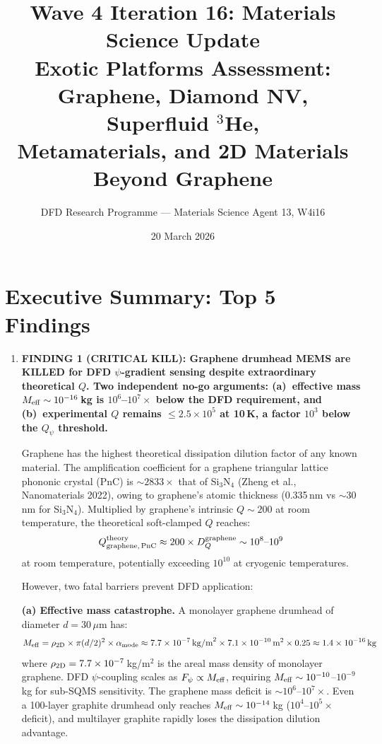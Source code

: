 \documentclass[11pt]{article}
\title{Wave 4 Iteration 16: Materials Science Update\\
\large Exotic Platforms Assessment:\\
Graphene, Diamond NV, Superfluid $^3$He,\\
Metamaterials, and 2D Materials Beyond Graphene}
\author{DFD Research Programme --- Materials Science Agent 13, W4i16}
\date{20 March 2026}
\theoremstyle{definition}
\theoremstyle{remark}
\newcommand{\ee}[1]{\times 10^{#1}}
\newcommand{\Meff}{M_{\rm eff}}
\newcommand{\Qpsi}{Q_\psi}
\begin{document}
\maketitle
\tableofcontents
\newpage

\section{Executive Summary: Top 5 Findings}
\label{sec:top5}

\begin{tcolorbox}[colback=blue!5!white, colframe=blue!50!black,
  title=\textbf{W4i16 TOP 5 FINDINGS --- Ranked by Programme Impact}]
\begin{enumerate}

\item \textbf{FINDING 1 (CRITICAL KILL): Graphene drumhead MEMS are
KILLED for DFD $\psi$-gradient sensing despite extraordinary
theoretical $Q$. Two independent no-go arguments: (a)~effective mass
$\Meff \sim 10^{-16}$\,kg is $10^{6}$--$10^{7}\times$ below the DFD
requirement, and (b)~experimental $Q$ remains $\leq 2.5\ee{5}$ at 10\,K,
a factor $10^{3}$ below the $\Qpsi$ threshold.}

Graphene has the highest theoretical dissipation dilution factor of any
known material. The amplification coefficient for a graphene triangular
lattice phononic crystal (PnC) is $\sim 2833\times$ that of Si$_3$N$_4$
(Zheng et al., Nanomaterials 2022), owing to graphene's
atomic thickness (0.335\,nm vs $\sim$30\,nm for Si$_3$N$_4$). Multiplied
by graphene's intrinsic $Q \sim 200$ at room temperature, the theoretical
soft-clamped $Q$ reaches:
\begin{equation}
Q_{\rm graphene,\,PnC}^{\rm theory} \approx 200 \times D_Q^{\rm graphene}
\sim 10^8\text{--}10^9
\label{eq:graphene_theory}
\end{equation}
at room temperature, potentially exceeding $10^{10}$ at cryogenic
temperatures.

However, two fatal barriers prevent DFD application:

\textbf{(a) Effective mass catastrophe.} A monolayer graphene drumhead
of diameter $d = 30$\,$\mu$m has:
\begin{equation}
\Meff = \rho_{\rm 2D} \times \pi (d/2)^2 \times \alpha_{\rm mode}
\approx 7.7\ee{-7}\,\text{kg/m}^2 \times 7.1\ee{-10}\,\text{m}^2
\times 0.25 \approx 1.4\ee{-16}\,\text{kg}
\label{eq:graphene_mass}
\end{equation}
where $\rho_{\rm 2D} = 7.7\ee{-7}$\,kg/m$^2$ is the areal mass density
of monolayer graphene. DFD $\psi$-coupling scales
as $F_\psi \propto \Meff$, requiring $\Meff \sim 10^{-10}$--$10^{-9}$\,kg
for sub-SQMS sensitivity. The graphene mass deficit is
$\sim 10^{6}$--$10^{7}\times$. Even a 100-layer graphite drumhead only
reaches $\Meff \sim 10^{-14}$\,kg ($10^{4}$--$10^{5}\times$ deficit),
and multilayer graphite rapidly loses the dissipation dilution advantage.


\end{enumerate}
\end{tcolorbox}
\end{document}
